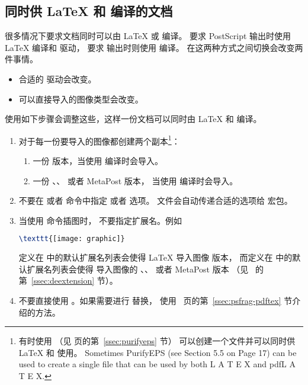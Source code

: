 \subsection{同时供 \LaTeX{} 和 \pdfLaTeX{} 编译的文档 }
很多情况下要求文档同时可以由 \LaTeX{} 或 \pdfLaTeX{} 编译。
要求 PostScript 输出时使用 \LaTeX{} 编译和  驱动，
要求  输出时则使用 \pdfLaTeX{} 编译。
在这两种方式之间切换会改变两件事情。
\begin{itemize}
	\item 合适的  驱动会改变。
	\item 可以直接导入的图像类型会改变。
\end{itemize}
使用如下步骤会调整这些，这样一份文档可以同时由 \LaTeX{} 和 \pdfLaTeX{} 编译。
\begin{enumerate}
	\item 对于每一份要导入的图像都创建两个副本\footnote{
		有时使用  （见 \pageref{ssec:purifyeps} 页的第~\ref{ssec:purifyeps} 节） 可以创建一个文件并可以同时供 \LaTeX{} 和 \pdfLaTeX{} 使用。
		 Sometimes PurifyEPS (see Section 5.5 on Page 17) can be used to create a single file that can
		 be used by both L
		 A T E X and pdfL A T E X.}：
	\begin{enumerate}
		\item 一份  版本，当使用  编译时会导入。
		\item 一份 、、 或者 MetaPost 版本，
		当使用  编译时会导入。
	\end{enumerate}
	
	\item 不要在  或者  命令中指定  或者  选项。
	 文件会自动传递合适的选项给  宏包。
	
	\item 当使用  命令插图时，
	不要指定扩展名。例如
\begin{lstlisting}[language=LaTeX]
\texttt{[image: graphic]}
\end{lstlisting}
	定义在  中的默认扩展名列表会使得 \LaTeX{} 导入图像  版本，
	而定义在  中的默认扩展名列表会使得 \pdfLaTeX{} 导入图像的 、、 或者 MetaPost 版本
	（见~\pageref{ssec:deextension} 的第~\ref{ssec:deextension} 节）。
	
	\item 不要直接使用 。如果需要进行  替换，
	使用~\pageref{ssec:psfrag-pdftex} 页的第~\ref{ssec:psfrag-pdftex} 节介绍的方法。
\end{enumerate}

